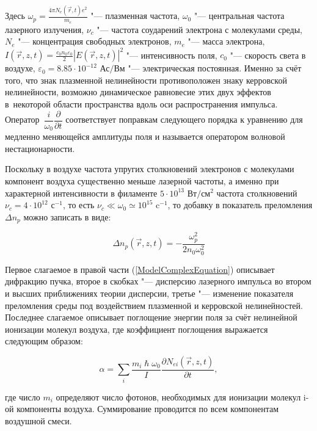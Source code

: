 Здесь $\omega_p = \frac{4 \pi N_e(\vec{r}, t) e^2}{m_e}$ "--- плазменная частота,
$\omega_0$ "--- центральная частота лазерного излучения,
$\nu_c$ "--- частота соударений электрона с молекулами среды, $N_e$ "--- концентрация свободных электронов,
$m_e$ "--- масса электрона, $I(\vec{r}, z, t) = \frac{c_0 n_0 \varepsilon_0}{2}|E(\vec{r}, z, t)|^2$ "--- интенсивность поля,
$c_0$ "--- скорость света в воздухе, $\varepsilon_0 = 8.85 \cdot 10^{-12}\textrm{ Ас/Вм}$ "--- электрическая постоянная.
Именно за счёт того, что знак плазменной нелинейности противоположен знаку керровской нелинейности,
возможно динамическое равновесие этих двух эффектов в~некоторой области пространства вдоль
оси распространения импульса. Оператор~$\dfrac{i}{\omega_0}\dfrac{\partial}{\partial t}$
соответствует поправкам следующего порядка к уравнению для медленно меняющейся амплитуды поля и называется оператором волновой нестационарности.


Поскольку в воздухе частота упругих столкновений электронов с молекулами компонент воздуха существенно меньше
лазерной частоты, а именно при характерной интенсивности в филаменте $5 \cdot 10^{13}\textrm{ Вт}/\textrm{см}^2$
частота столкновений $\nu_c = 4 \cdot 10^{12}\textrm{ с}^{-1}$, то есть $\nu_c \ll \omega_0 \simeq 10^{15}\textrm{ c}^{-1}$,
то добавку в показатель преломления $\Delta n_p$ можно записать в виде:

\begin{equation}\label{ModelNplasma}
\Delta n_p(\vec{r}, z, t) = -\frac{\omega_p^2}{2 n_0 \omega_0^2}
\end{equation}

Первое слагаемое в правой части (\ref{ModelComplexEquation}) описывает дифракцию пучка,
второе в скобках "--- дисперсию лазерного импульса во втором и высших приближениях теории дисперсии,
третье "--- изменение показателя преломления среды под воздействием плазменной и керровской нелинейностей.
Последнее слагаемое описывает поглощение энергии поля за счёт нелинейной ионизации молекул воздуха,
где коэффициент поглощения выражается следующим образом:

\begin{equation}\label{ModelAlphaIon}
\alpha = \sum_i \frac{m_i \hslash \omega_0}{I} \dfrac{\partial N_{ei}(\vec{r}, z, t)}{\partial t},
\end{equation}


\noindent где число $m_i$ определяют число фотонов, необходимых для ионизации молекул i-ой компоненты воздуха.
Суммирование проводится по всем компонентам воздушной смеси.


